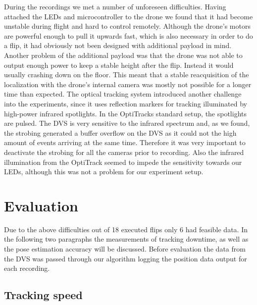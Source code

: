 During the recordings we met a number of unforeseen difficulties. Having attached the LEDs and microcontroller to the drone we found that it had become unstable during flight and hard to control remotely. Although the drone’s motors are powerful enough to pull it upwards fast, which is also necessary in order to do a flip, it had obviously not been designed with additional payload in mind. Another problem of the additional payload was that the drone was not able to output enough power to keep a stable height after the flip. Instead it would usually crashing down on the floor. This meant that a stable reacquisition of the localization with the drone’s internal camera was mostly not possible for a longer time than expected. 
The optical tracking system introduced another challenge into the experiments, since it uses reflection markers for tracking illuminated by high-power infrared spotlights. In the OptiTracks standard setup, the spotlights are pulsed. The DVS is very sensitive to the infrared spectrum and, as we found, the strobing generated a buffer overflow on the DVS as it could not the high amount of events arriving at the same time. Therefore it was very important to deactivate the strobing for all the cameras prior to recording. Also the infrared illumination from the OptiTrack seemed to impede the sensitivity towards our LEDs, although this was not a problem for our experiment setup.


\section{Evaluation}\label{sec:evaluation}

Due to the above difficulties out of 18 executed flips only 6 had feasible data. In the following two paragraphs the measurements of tracking downtime, as well as the pose estimation accuracy will be discussed. Before evaluation the data from the DVS was passed through our algorithm logging the position data output for each recording. 


\subsection{Tracking speed}\label{sec:trackingspeed}

